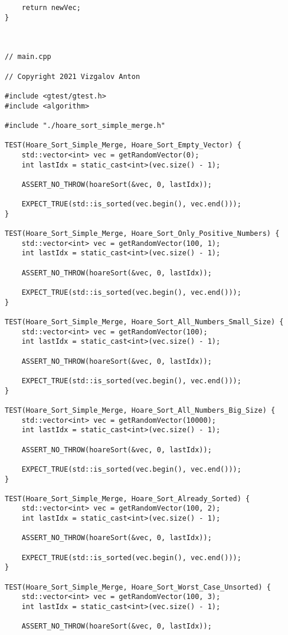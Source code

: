\documentclass{report}
\begin{document}
\begin{lstlisting}
    return newVec;
}



// main.cpp

// Copyright 2021 Vizgalov Anton

#include <gtest/gtest.h>
#include <algorithm>

#include "./hoare_sort_simple_merge.h"

TEST(Hoare_Sort_Simple_Merge, Hoare_Sort_Empty_Vector) {
    std::vector<int> vec = getRandomVector(0);
    int lastIdx = static_cast<int>(vec.size() - 1);

    ASSERT_NO_THROW(hoareSort(&vec, 0, lastIdx));

    EXPECT_TRUE(std::is_sorted(vec.begin(), vec.end()));
}

TEST(Hoare_Sort_Simple_Merge, Hoare_Sort_Only_Positive_Numbers) {
    std::vector<int> vec = getRandomVector(100, 1);
    int lastIdx = static_cast<int>(vec.size() - 1);

    ASSERT_NO_THROW(hoareSort(&vec, 0, lastIdx));

    EXPECT_TRUE(std::is_sorted(vec.begin(), vec.end()));
}

TEST(Hoare_Sort_Simple_Merge, Hoare_Sort_All_Numbers_Small_Size) {
    std::vector<int> vec = getRandomVector(100);
    int lastIdx = static_cast<int>(vec.size() - 1);

    ASSERT_NO_THROW(hoareSort(&vec, 0, lastIdx));

    EXPECT_TRUE(std::is_sorted(vec.begin(), vec.end()));
}

TEST(Hoare_Sort_Simple_Merge, Hoare_Sort_All_Numbers_Big_Size) {
    std::vector<int> vec = getRandomVector(10000);
    int lastIdx = static_cast<int>(vec.size() - 1);

    ASSERT_NO_THROW(hoareSort(&vec, 0, lastIdx));

    EXPECT_TRUE(std::is_sorted(vec.begin(), vec.end()));
}

TEST(Hoare_Sort_Simple_Merge, Hoare_Sort_Already_Sorted) {
    std::vector<int> vec = getRandomVector(100, 2);
    int lastIdx = static_cast<int>(vec.size() - 1);

    ASSERT_NO_THROW(hoareSort(&vec, 0, lastIdx));

    EXPECT_TRUE(std::is_sorted(vec.begin(), vec.end()));
}

TEST(Hoare_Sort_Simple_Merge, Hoare_Sort_Worst_Case_Unsorted) {
    std::vector<int> vec = getRandomVector(100, 3);
    int lastIdx = static_cast<int>(vec.size() - 1);

    ASSERT_NO_THROW(hoareSort(&vec, 0, lastIdx));


\end{lstlisting}
\end{document}
